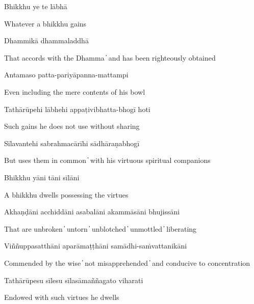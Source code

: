 Bhikkhu ye te lābhā

\begin{cprenglish}
Whatever a bhikkhu gains
\end{cprenglish}

Dhammikā dhammaladdhā

\begin{cprenglish}
That accords with the Dhamma  ̓  and has been righteously obtained
\end{cprenglish}

Antamaso patta-pariyāpanna-mattampi

\begin{cprenglish}
Even including the mere contents of his bowl
\end{cprenglish}

Tathārūpehi lābhehi appaṭivibhatta-bhogī hoti

\begin{cprenglish}
Such gains he does not use without sharing
\end{cprenglish}

Sīlavantehi sabrahmacārīhi sādhāraṇabhogī

\begin{cprenglish}
But uses them in common  ̓  with his virtuous spiritual companions
\end{cprenglish}

Bhikkhu yāni tāni sīlāni

\begin{cprenglish}
A bhikkhu dwells possessing the virtues
\end{cprenglish}

Akhaṇḍāni acchiddāni asabalāni akammāsāni bhujissāni

\begin{cprenglish}
That are unbroken  ̓  untorn  ̓  unblotched  ̓  unmottled  ̓  liberating
\end{cprenglish}

Viññuppasatthāni aparāmaṭṭhāni samādhi-saṁvattanikāni

\begin{cprenglish}
Commended by the wise  ̓  not misapprehended  ̓  and conducive to concentration
\end{cprenglish}

Tathārūpesu sīlesu sīlasāmaññagato viharati

\begin{cprenglish}
Endowed with such virtues he dwells
\end{cprenglish}

